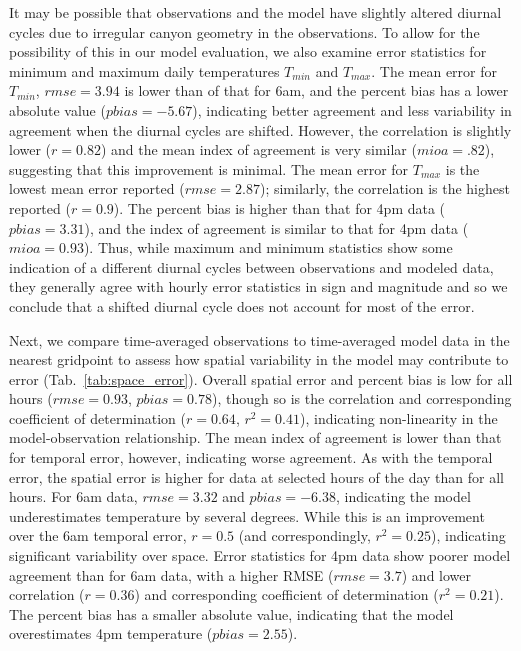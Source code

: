\documentclass[draft,linenumbers]{agujournal}
\begin{document}
It may be possible that observations and the model have slightly altered diurnal cycles due to irregular canyon geometry in the observations. To allow for the possibility of this in our model evaluation, we also examine error statistics for minimum and maximum daily temperatures $T_{min}$ and $T_{max}$. The mean error for $T_{min}$, $rmse=3.94$ is lower than of that for 6am, and the percent bias has a lower absolute value ($pbias=-5.67$), indicating better agreement and less variability in agreement when the diurnal cycles are shifted. However, the correlation is slightly lower ($r=0.82$) and the mean index of agreement is very similar ($mioa=.82$), suggesting that this improvement is minimal. The mean error for $T_{max}$ is the lowest mean error reported ($rmse=2.87$); similarly, the correlation is the highest reported ($r=0.9$). The percent bias is higher than that for 4pm data ($pbias=3.31$), and the index of agreement is similar to that for 4pm data ($mioa=0.93$).
Thus, while maximum and minimum statistics show some indication of a different diurnal cycles between observations and modeled data, they generally agree with hourly error statistics in sign and magnitude and so we conclude that a shifted diurnal cycle does not account for most of the error.

Next, we compare time-averaged observations to time-averaged model data in the nearest gridpoint to assess how spatial variability in the model may contribute to error (Tab.~\ref{tab:space_error}). Overall spatial error and percent bias is low for all hours ($rmse=0.93$, $pbias=0.78$), though so is the correlation and corresponding coefficient of determination ($r=0.64$, $r^2=0.41$), indicating non-linearity in the model-observation relationship. 
The mean index of agreement is lower than that for temporal error, however, indicating worse agreement. 
As with the temporal error, the spatial error is higher for data at selected hours of the day than for all hours. For 6am data, $rmse=3.32$ and $pbias=-6.38$, indicating the model underestimates temperature by several degrees. While this is an improvement over the 6am temporal error, $r=0.5$ (and correspondingly, $r^2 = 0.25$), indicating significant variability over space. Error statistics for 4pm data show poorer model agreement than for 6am data, with a higher RMSE ($rmse = 3.7$) and lower correlation ($r=0.36$) and corresponding coefficient of determination ($r^2 = 0.21$). The percent bias has a smaller absolute value, indicating that the model overestimates 4pm temperature ($pbias=2.55$). 
\end{document}
